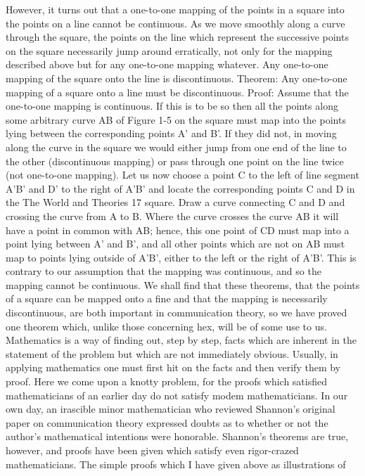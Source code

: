 However, it turns out that a one-to-one mapping of the points
in a square into the points on a line cannot be continuous. As we
move smoothly along a curve through the square, the points on
the line which represent the successive points on the square necessarily
jump around erratically, not only for the mapping described
above but for any one-to-one mapping whatever. Any one-to-one
mapping of the square onto the line is discontinuous.
Theorem: Any one-to-one mapping of a square onto a line must
be discontinuous.
Proof: Assume that the one-to-one mapping is continuous. If
this is to be so then all the points along some arbitrary curve AB
of Figure 1-5 on the square must map into the points lying between
the corresponding points A' and B'. If they did not, in moving along
the curve in the square we would either jump from one end of the
line to the other (discontinuous mapping) or pass through one
point on the line twice (not one-to-one mapping). Let us now
choose a point C to the left of line segment A'B' and D' to the
right of A'B' and locate the corresponding points C and D in the
The World and Theories 17
square. Draw a curve connecting C and D and crossing the curve
from A to B. Where the curve crosses the curve AB it will have a
point in common with AB; hence, this one point of CD must map
into a point lying between A' and B', and all other points which
are not on AB must map to points lying outside of A'B’, either to
the left or the right of A'B'. This is contrary to our assumption that
the mapping was continuous, and so the mapping cannot be
continuous.
We shall find that these theorems, that the points of a square
can be mapped onto a fine and that the mapping is necessarily
discontinuous, are both important in communication theory, so we
have proved one theorem which, unlike those concerning hex, will
be of some use to us.
Mathematics is a way of finding out, step by step, facts which
are inherent in the statement of the problem but which are not
immediately obvious. Usually, in applying mathematics one must
first hit on the facts and then verify them by proof. Here we come
upon a knotty problem, for the proofs which satisfied mathematicians
of an earlier day do not satisfy modem mathematicians.
In our own day, an irascible minor mathematician who reviewed
Shannon’s original paper on communication theory expressed
doubts as to whether or not the author’s mathematical intentions
were honorable. Shannon’s theorems are true, however, and proofs
have been given which satisfy even rigor-crazed mathematicians.
The simple proofs which I have given above as illustrations of
